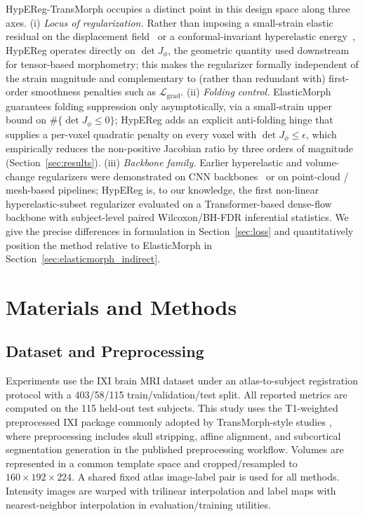 \documentclass[jimaging,article,submit,pdftex,moreauthors]{Definitions/mdpi}
\begin{document}
HypEReg-TransMorph occupies a distinct point in this design space along three axes. (i) \emph{Locus of regularization.} Rather than imposing a small-strain elastic residual on the displacement field~\cite{elasticmorph2025} or a conformal-invariant hyperelastic energy~\cite{zou2023conformal}, HypEReg operates directly on $\det J_\phi$, the geometric quantity used downstream for tensor-based morphometry; this makes the regularizer formally independent of the strain magnitude and complementary to (rather than redundant with) first-order smoothness penalties such as $\mathcal{L}_{\mathrm{grad}}$. (ii) \emph{Folding control.} ElasticMorph~\cite{elasticmorph2025} guarantees folding suppression only asymptotically, via a small-strain upper bound on $\#\{\det J_\phi\le 0\}$; HypEReg adds an explicit anti-folding hinge that supplies a per-voxel quadratic penalty on every voxel with $\det J_\phi\le\epsilon$, which empirically reduces the non-positive Jacobian ratio by three orders of magnitude (Section~\ref{sec:results}). (iii) \emph{Backbone family.} Earlier hyperelastic and volume-change regularizers were demonstrated on CNN backbones~\cite{mok2020fast,hering2021lung,zou2023conformal} or on point-cloud / mesh-based pipelines; HypEReg is, to our knowledge, the first non-linear hyperelastic-subset regularizer evaluated on a Transformer-based dense-flow backbone with subject-level paired Wilcoxon/BH-FDR inferential statistics. We give the precise differences in formulation in Section~\ref{sec:loss} and quantitatively position the method relative to ElasticMorph in Section~\ref{sec:elasticmorph_indirect}.

\section{Materials and Methods}

\subsection{Dataset and Preprocessing}
Experiments use the IXI brain MRI dataset \cite{ixidataset} under an atlas-to-subject registration protocol with a 403/58/115 train/validation/test split. All reported metrics are computed on the 115 held-out test subjects. This study uses the T1-weighted preprocessed IXI package commonly adopted by TransMorph-style studies \cite{chen2022transmorph,kim2021cyclemorph}, where preprocessing includes skull stripping, affine alignment, and subcortical segmentation generation in the published preprocessing workflow. Volumes are represented in a common template space and cropped/resampled to \(160 \times 192 \times 224\). A shared fixed atlas image-label pair is used for all methods. Intensity images are warped with trilinear interpolation and label maps with nearest-neighbor interpolation in evaluation/training utilities.
\end{document}
